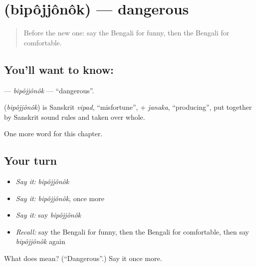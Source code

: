 \section[\texorpdfstring{\bn{বিপজ্জনক} (bipôjjônôk)}{বিপজ্জনক (bipôjjônôk)}]{ (bipôjjônôk) — dangerous}

\label{lesson:BN-C141-bipojjonok}



\begin{quote}
Before the new one: say the Bengali for funny, then the Bengali for comfortable.
\end{quote}

\subsection*{You'll want to know: }
\textbf{} — \emph{bipôjjônôk} — \textquotedblleft{}dangerous\textquotedblright{}.

\begin{cousinweb}
\textbf{} (\emph{bipôjjônôk}) is Sanskrit \emph{vipad}, \textquotedblleft{}misfortune\textquotedblright{}, + \emph{janaka}, \textquotedblleft{}producing\textquotedblright{}, put together by Sanskrit sound rules and taken over whole.
\end{cousinweb}

\begin{grammarlens}[title={What you've built}]
One more word for this chapter.
\end{grammarlens}

\subsection*{Your turn}
\begin{itemize}
\raggedright
  \item \emph{Say it:} \emph{bipôjjônôk}
  \item \emph{Say it:} \emph{bipôjjônôk}, once more
  \item \emph{Say it:} say \emph{bipôjjônôk}
  \item \emph{Recall:} say the Bengali for funny, then the Bengali for comfortable, then say \emph{bipôjjônôk} again
\end{itemize}

\begin{tcolorbox}[breakable,colback=teal!4,colframe=teal!35!black,title={Before you move on}]
What does  mean? (\textquotedblleft{}Dangerous\textquotedblright{}.) Say it once more.
\end{tcolorbox}
